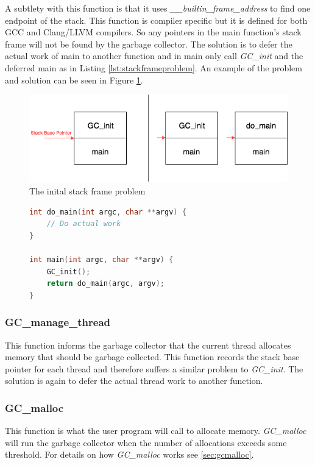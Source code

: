 \documentclass[../diss.tex]{subfiles}
\begin{document}
A subtlety with this function is that it uses \emph{\_\_builtin\_frame\_address} to find one endpoint of the stack. This function is compiler specific but it is defined for both GCC and Clang/LLVM compilers. So any pointers in the main function's stack frame will not be found by the garbage collector. The solution is to defer the actual work of main to another function and in main only call \emph{GC\_init} and the deferred main as in Listing \ref{lst:stackframeproblem}. An example of the problem and solution can be seen in Figure \ref{fig:stackproblem}.

\begin{figure}
    \centering
    \includegraphics[max width=\linewidth]{figs/stackproblem.png}
    \caption{The inital stack frame problem}
    \label{fig:stackproblem}
\end{figure}

\begin{figure}
\begin{lstlisting}[language=C, caption=Solution to the stack frame problem, label={lst:stackframeproblem}]
int do_main(int argc, char **argv) {
    // Do actual work
}

int main(int argc, char **argv) {
    GC_init();
    return do_main(argc, argv);
}
\end{lstlisting}
\end{figure}

\subsubsection{GC\_manage\_thread}
This function informs the garbage collector that the current thread allocates memory that should be garbage collected. This function records the stack base pointer for each thread and therefore suffers a similar problem to \emph{GC\_init}. The solution is again to defer the actual thread work to another function.

\subsubsection{GC\_malloc}
This function is what the user program will call to allocate memory. \emph{GC\_malloc} will run the garbage collector when the number of allocations exceeds some threshold. For details on how \emph{GC\_malloc} works see \cref{sec:gcmalloc}.
\end{document}
